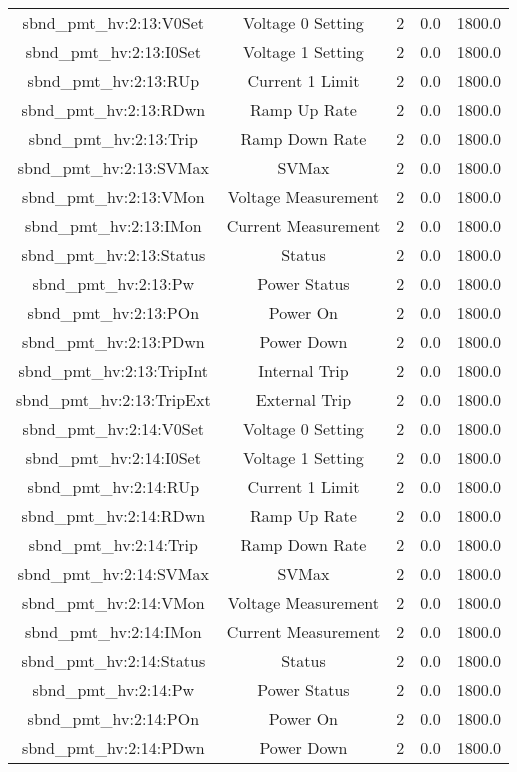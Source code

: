 \begin{table}[ptb]
\begin{tabular}{c | c c c c}
sbnd_pmt_hv:2:13:V0Set & Voltage 0 Setting & 2 & 0.0 & 1800.0\\ 
sbnd_pmt_hv:2:13:I0Set & Voltage 1 Setting & 2 & 0.0 & 1800.0\\ 
sbnd_pmt_hv:2:13:RUp & Current 1 Limit & 2 & 0.0 & 1800.0\\ 
sbnd_pmt_hv:2:13:RDwn & Ramp Up Rate & 2 & 0.0 & 1800.0\\ 
sbnd_pmt_hv:2:13:Trip & Ramp Down Rate & 2 & 0.0 & 1800.0\\ 
sbnd_pmt_hv:2:13:SVMax & SVMax & 2 & 0.0 & 1800.0\\ 
sbnd_pmt_hv:2:13:VMon & Voltage Measurement & 2 & 0.0 & 1800.0\\ 
sbnd_pmt_hv:2:13:IMon & Current Measurement & 2 & 0.0 & 1800.0\\ 
sbnd_pmt_hv:2:13:Status & Status & 2 & 0.0 & 1800.0\\ 
sbnd_pmt_hv:2:13:Pw & Power Status & 2 & 0.0 & 1800.0\\ 
sbnd_pmt_hv:2:13:POn & Power On & 2 & 0.0 & 1800.0\\ 
sbnd_pmt_hv:2:13:PDwn & Power Down & 2 & 0.0 & 1800.0\\ 
sbnd_pmt_hv:2:13:TripInt & Internal Trip & 2 & 0.0 & 1800.0\\ 
sbnd_pmt_hv:2:13:TripExt & External Trip & 2 & 0.0 & 1800.0\\ 
sbnd_pmt_hv:2:14:V0Set & Voltage 0 Setting & 2 & 0.0 & 1800.0\\ 
sbnd_pmt_hv:2:14:I0Set & Voltage 1 Setting & 2 & 0.0 & 1800.0\\ 
sbnd_pmt_hv:2:14:RUp & Current 1 Limit & 2 & 0.0 & 1800.0\\ 
sbnd_pmt_hv:2:14:RDwn & Ramp Up Rate & 2 & 0.0 & 1800.0\\ 
sbnd_pmt_hv:2:14:Trip & Ramp Down Rate & 2 & 0.0 & 1800.0\\ 
sbnd_pmt_hv:2:14:SVMax & SVMax & 2 & 0.0 & 1800.0\\ 
sbnd_pmt_hv:2:14:VMon & Voltage Measurement & 2 & 0.0 & 1800.0\\ 
sbnd_pmt_hv:2:14:IMon & Current Measurement & 2 & 0.0 & 1800.0\\ 
sbnd_pmt_hv:2:14:Status & Status & 2 & 0.0 & 1800.0\\ 
sbnd_pmt_hv:2:14:Pw & Power Status & 2 & 0.0 & 1800.0\\ 
sbnd_pmt_hv:2:14:POn & Power On & 2 & 0.0 & 1800.0\\ 
sbnd_pmt_hv:2:14:PDwn & Power Down & 2 & 0.0 & 1800.0\\ 

\end{tabular}
\end{table}

